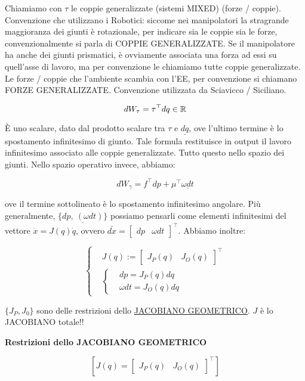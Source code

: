 Chiamiamo con $\tau$ le coppie generalizzate (sistemi MIXED) (forze / coppie). Convenzione che utilizzano i Robotici: siccome nei manipolatori la stragrande maggioranza dei giunti è rotazionale, per indicare sia le coppie sia le forze, convenzionalmente si parla di COPPIE GENERALIZZATE. Se il manipolatore ha anche dei giunti prismatici, è ovviamente associata una forza ad essi su quell'asse di lavoro, ma per convenzione le chiamiamo tutte coppie generalizzate. Le forze / coppie che l'ambiente scambia con l'EE, per convenzione si chiamano FORZE GENERALIZZATE. Convenzione utilizzata da Sciavicco / Siciliano.

\[
	dW_\tau = \tau^\top dq\in\mathbb{R}
\]

\`E uno scalare, dato dal prodotto scalare tra $\tau$ e $\underline{dq}$, ove l'ultimo termine è lo spostamento infinitesimo di giunto. Tale formula restituisce in output il lavoro infinitesimo associato alle coppie generalizzate. Tutto questo nello spazio dei giunti. Nello spazio operativo invece, abbiamo:

\[
	dW_\gamma = f^\top dp + \mu^\top \underline{\omega dt}
\]

ove il termine sottolineato è lo spostamento infinitesimo angolare. \newline Più generalmente, $\{\underline{dp,\ (\omega dt)}\}$ possiamo pensarli come elementi infinitesimi del vettore $\dot{x}=J(q)\dot{q}$, ovvero $\bar{dx} = \begin{bmatrix}dp&\omega dt\end{bmatrix}^\top$. Abbiamo inoltre:

\[
	\left\{
	\begin{aligned}
	&J(q) := \begin{bmatrix}J_P(q)&J_O(q)\end{bmatrix}^\top\\
	&\left\{
	\begin{aligned}
	&dp=J_P(q)dq\\
	&\omega dt = J_O(q)dq
	\end{aligned}
	\right.
	\end{aligned}
	\right.
\]

$\{J_P,J_0\}$ sono delle restrizioni dello \underline{\underline{JACOBIANO GEOMETRICO}}. $J$ è lo JACOBIANO totale!!

\begin{defn}{\textbf{Restrizioni dello JACOBIANO GEOMETRICO}}

\[
	[J(q)=\begin{bmatrix}J_P(q)&J_O(q)\end{bmatrix}^\top]
\]

\end{defn}

